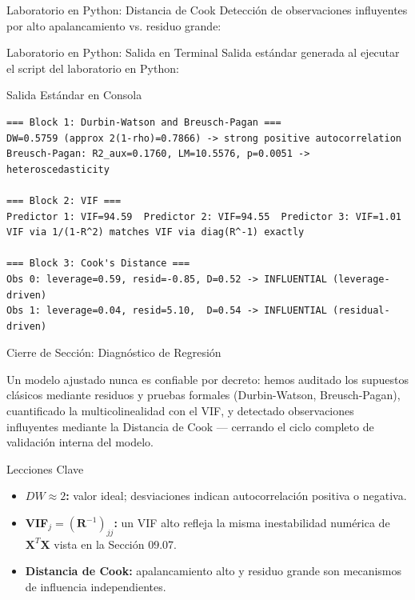 \documentclass[10pt, aspectratio=169]{beamer}
\begin{document}
\begin{frame}[fragile]{Laboratorio en Python: Distancia de Cook}
  \scriptsize
  Detección de observaciones influyentes por alto apalancamiento vs. residuo grande:
  {
  }
\end{frame}

\begin{frame}[fragile]{Laboratorio en Python: Salida en Terminal}
  \scriptsize
  Salida estándar generada al ejecutar el script del laboratorio en Python:
  \vspace{0.02cm}
  \begin{block}{Salida Estándar en Consola}
    \fontsize{3.6pt}{4.3pt}\selectfont
    \begin{verbatim}
=== Block 1: Durbin-Watson and Breusch-Pagan ===
DW=0.5759 (approx 2(1-rho)=0.7866) -> strong positive autocorrelation
Breusch-Pagan: R2_aux=0.1760, LM=10.5576, p=0.0051 -> heteroscedasticity

=== Block 2: VIF ===
Predictor 1: VIF=94.59  Predictor 2: VIF=94.55  Predictor 3: VIF=1.01
VIF via 1/(1-R^2) matches VIF via diag(R^-1) exactly

=== Block 3: Cook's Distance ===
Obs 0: leverage=0.59, resid=-0.85, D=0.52 -> INFLUENTIAL (leverage-driven)
Obs 1: leverage=0.04, resid=5.10,  D=0.54 -> INFLUENTIAL (residual-driven)
    \end{verbatim}
  \end{block}
\end{frame}

\begin{frame}{Cierre de Sección: Diagnóstico de Regresión}
  \begin{reflexion}
    Un modelo ajustado nunca es confiable por decreto: hemos auditado los supuestos clásicos mediante residuos y pruebas formales (Durbin-Watson, Breusch-Pagan), cuantificado la multicolinealidad con el VIF, y detectado observaciones influyentes mediante la Distancia de Cook --- cerrando el ciclo completo de validación interna del modelo.
  \end{reflexion}

  \vspace{0.2cm}
  \pause
  \begin{block}{Lecciones Clave}
    \begin{itemize}\itemsep=0.08cm
      \item \textbf{$DW\approx2$:} valor ideal; desviaciones indican autocorrelación positiva o negativa.
      \item \textbf{VIF$_j=(\mathbf{R}^{-1})_{jj}$:} un VIF alto refleja la misma inestabilidad numérica de $\mathbf{X}^T\mathbf{X}$ vista en la Sección 09.07.
      \item \textbf{Distancia de Cook:} apalancamiento alto y residuo grande son mecanismos de influencia independientes.
    \end{itemize}
  \end{block}
\end{frame}
\end{document}
